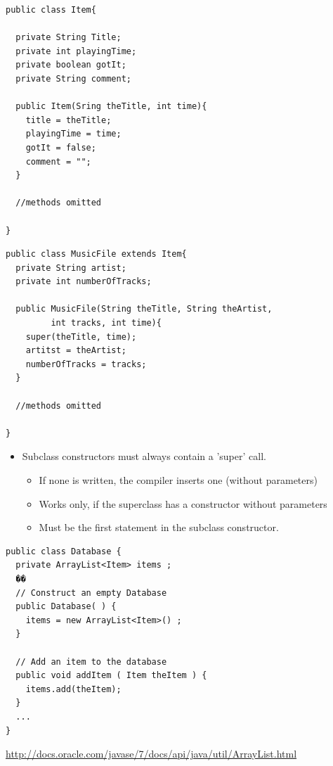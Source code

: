 \documentclass{beamer}
\begin{document}
\begin{frame}[fragile]
\small
\begin{block}{}
\begin{lstlisting}
public class Item{
	
  private String Title;
  private int playingTime;
  private boolean gotIt;
  private String comment;

  public Item(Sring theTitle, int time){
    title = theTitle;
    playingTime = time;
    gotIt = false;
    comment = "";	
  }	

  //methods omitted
 
}
\end{lstlisting}
\end{block}
\end{frame}

\begin{frame}[fragile]
\begin{block}{}
\begin{lstlisting}
public class MusicFile extends Item{
  private String artist;
  private int numberOfTracks;

  public MusicFile(String theTitle, String theArtist,
  		 int tracks, int time){
    super(theTitle, time);
    artitst = theArtist;
    numberOfTracks = tracks;
  } 
 
  //methods omitted
 
}
\end{lstlisting}
\end{block}
\end{frame}

\begin{frame}
\begin{itemize}
\item Subclass constructors must always contain a 'super' call.
\begin{itemize}
\item If none is written, the compiler inserts one (without parameters)
\item Works only, if the superclass has a constructor without parameters
\item Must be the first statement in the subclass constructor.
\end{itemize}
\end{itemize}
\end{frame}

\begin{frame}[fragile]
\begin{block}{}
\begin{lstlisting}
public class Database {
  private ArrayList<Item> items ;
  ��
  // Construct an empty Database
  public Database( ) {
    items = new ArrayList<Item>() ; 
  }

  // Add an item to the database
  public void addItem ( Item theItem ) {
    items.add(theItem);
  }
  ...
}
\end{lstlisting}
\end{block}
\url{http://docs.oracle.com/javase/7/docs/api/java/util/ArrayList.html}
\end{frame}
\end{document}
